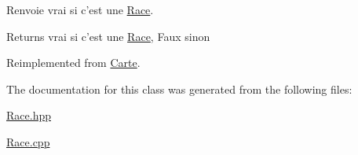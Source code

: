 Renvoie vrai si c'est une \hyperlink{class_race}{Race}. 

\begin{DoxyReturn}{Returns}
vrai si c'est une \hyperlink{class_race}{Race}, Faux sinon 
\end{DoxyReturn}


Reimplemented from \hyperlink{class_carte_acbac53716e6285801ca151aa177fc699}{Carte}.



The documentation for this class was generated from the following files\-:\begin{DoxyCompactItemize}
\item 
\hyperlink{_race_8hpp}{Race.\-hpp}\item 
\hyperlink{_race_8cpp}{Race.\-cpp}\end{DoxyCompactItemize}
